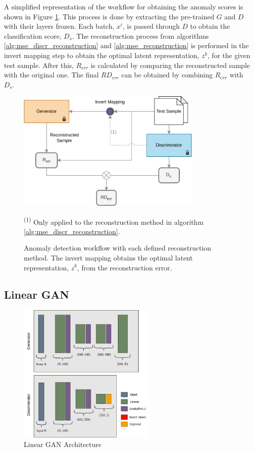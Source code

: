 A simplified representation of the workflow for obtaining the anomaly scores is shown in Figure \ref{fig:anomaly_detection_method}. This process is done by extracting the pre-trained $G$ and $D$ with their layers frozen. Each batch, $x^i$, is passed through $D$ to obtain the classification score, $D_s$. The reconstruction process from algorithms \ref{alg:mse_discr_reconstruction} and \ref{alg:mse_reconstruction} is performed in the invert mapping step to obtain the optimal latent representation, $z^k$, for the given test sample. After this, $R_{err}$ is calculated by comparing the reconstructed sample with the original one. The final $RD_{err}$ can be obtained by combining $R_{err}$ with $D_s$.


\begin{figure}[]
    \centering
    \includegraphics[width=0.8\textwidth]{figures/gan_anomaly_detect_flow.png}
    \caption[Anomaly detection workflow]{Anomaly detection workflow with each defined reconstruction method. The invert mapping obtains the optimal latent representation, $z^k$, from the reconstruction error.}\label{fig:anomaly_detection_method}
    \small\textsuperscript{(1)} Only applied to the reconstruction method in algorithm \ref{alg:mse_discr_reconstruction}.
\end{figure}



\subsection{Linear GAN}\label{sec:linear_gan}

\begin{figure}
    \centering
    \includegraphics[width=0.6\textwidth]{figures/linearGAN.png}
    \caption{Linear GAN Architecture}
    \label{fig:linear_gan_architecture}
\end{figure}


